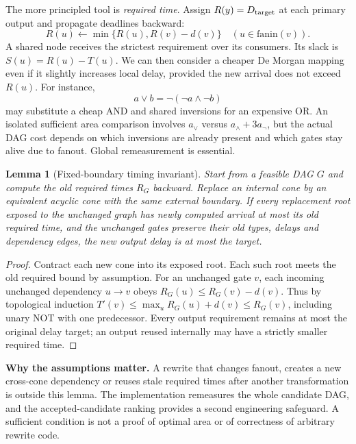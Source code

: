 \documentclass[a4paper,10pt]{article}
\newtheorem{lemma}[theorem]{Lemma}
\theoremstyle{definition}
\theoremstyle{remark}
\begin{document}
The more principled tool is \emph{required time}. Assign $R(y)=D_{\rm target}$ at each primary output and propagate deadlines backward:
\begin{equation}\label{eq:logrequired}
 R(u)\gets\min\{R(u),R(v)-d(v)\}
 \quad(u\in\mathrm{fanin}(v)).
\end{equation}
A shared node receives the strictest requirement over its consumers. Its slack is $S(u)=R(u)-T(u)$. We can then consider a cheaper De Morgan mapping even if it slightly increases local delay, provided the new arrival does not exceed $R(u)$. For instance,
\begin{equation}
 a\lor b=\neg(\neg a\land\neg b)
\end{equation}
may substitute a cheap AND and shared inversions for an expensive OR. An isolated sufficient area comparison involves $a_{\lor}$ versus $a_{\land}+3a_{\neg}$, but the actual DAG cost depends on which inversions are already present and which gates stay alive due to fanout. Global remeasurement is essential.

\begin{lemma}[Fixed-boundary timing invariant]
Start from a feasible DAG $G$ and compute the old required times $R_G$ backward. Replace an internal cone by an equivalent acyclic cone with the same external boundary. If every replacement root exposed to the unchanged graph has newly computed arrival at most its old required time, and the unchanged gates preserve their old types, delays and dependency edges, the new output delay is at most the target.
\end{lemma}
\begin{proof}
Contract each new cone into its exposed root. Each such root meets the old required bound by assumption. For an unchanged gate $v$, each incoming unchanged dependency $u\to v$ obeys $R_G(u)\le R_G(v)-d(v)$. Thus by topological induction $T'(v)\le\max_u R_G(u)+d(v)\le R_G(v)$, including unary NOT with one predecessor. Every output requirement remains at most the original delay target; an output reused internally may have a strictly smaller required time.
\end{proof}
\textbf{Why the assumptions matter.} A rewrite that changes fanout, creates a new cross-cone dependency or reuses stale required times after another transformation is outside this lemma. The implementation remeasures the whole candidate DAG, and the accepted-candidate ranking provides a second engineering safeguard. A sufficient condition is not a proof of optimal area or of correctness of arbitrary rewrite code.
\end{document}
